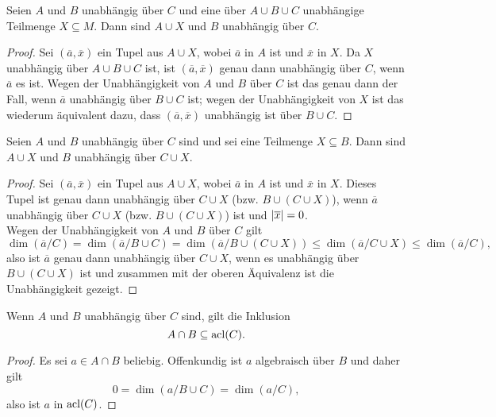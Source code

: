 \begin{lemma}
	Seien $A$ und $B$ unabhängig über $C$ und eine über $A\cup B\cup C$ unabhängige Teilmenge $X\subseteq M$. Dann sind $A\cup X$ und $B$ unabhängig über $C$.
\end{lemma}
\begin{proof}
	Sei $(\overline{a},\overline{x})$ ein Tupel aus $A\cup X$, wobei $\overline{a}$ in $A$ ist und $\overline{x}$ in $X$. Da $X$ unabhängig über $A\cup B\cup C$ ist, ist $(\overline{a},\overline{x})$ genau dann unabhängig über $C$, wenn $\overline{a}$ es ist. Wegen der Unabhängigkeit von $A$ und $B$ über $C$ ist das genau dann der Fall, wenn $\overline{a}$ unabhängig über $B\cup C$ ist; wegen der Unabhängigkeit von $X$ ist das wiederum äquivalent dazu, dass $(\overline{a},\overline{x})$ unabhängig ist über $B\cup C$.
\end{proof}
\newpage
\begin{lemma}
	Seien $A$ und $B$ unabhängig über $C$ sind und sei eine Teilmenge $X\subseteq B$. Dann sind $A\cup X$ und $B$ unabhängig über $C\cup X$.
\end{lemma}
\begin{proof}
	Sei $(\overline{a},\overline{x})$ ein Tupel aus $A\cup X$, wobei $\overline{a}$ in $A$ ist und $\overline{x}$ in $X$. Dieses Tupel ist genau dann unabhängig über $C\cup X$ (bzw. $B\cup(C\cup X)$), wenn $\overline{a}$ unabhängig über $C\cup X$ (bzw. $B\cup(C\cup X)$) ist und ${\left| \overline{x} \right|}=0$.\\
	Wegen der Unabhängigkeit von $A$ und $B$ über $C$ gilt $$\dim(\overline{a}/C)=\dim(\overline{a}/B\cup C)=\dim(\overline{a}/B\cup(C\cup X))\leq\dim(\overline{a}/C\cup X)\leq\dim(\overline{a}/C),$$ also ist $\overline{a}$ genau dann unabhängig über $C\cup X$, wenn es unabhängig über $B\cup(C\cup X)$ ist und zusammen mit der oberen Äquivalenz ist die Unabhängigkeit gezeigt.
\end{proof}

\begin{lemma}\label{Unabhängigkeit Schnitt}
	Wenn $A$ und $B$ unabhängig über $C$ sind, gilt die Inklusion $$A\cap B\subseteq\operatorname{acl}(C).$$
\end{lemma}
\begin{proof}
	Es sei $a\in A\cap B$ beliebig. Offenkundig ist $a$ algebraisch über $B$ und daher gilt $$0=\dim(a/B\cup C)=\dim(a/C),$$ also ist $a$ in $\operatorname{acl}(C)$.
\end{proof}

